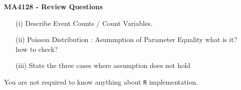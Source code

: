 \documentclass[MASTER.tex]{subfiles}
\begin{document}
\begin{frame}
	\large
\noindent \textbf{MA4128  - Review Questions} \smallskip
\begin{itemize}
\item[(i)] Describe Event Counts / Count Variables.
\item[(ii)] Poisson Distribution : Asummption of Parameter Equality what is it? how to check?
\item[(iii)] State the three cases where assumption does not hold
\end{itemize}
\smallskip
You are not required to know anything about \texttt{R} implementation.
\end{frame}
\end{document}
